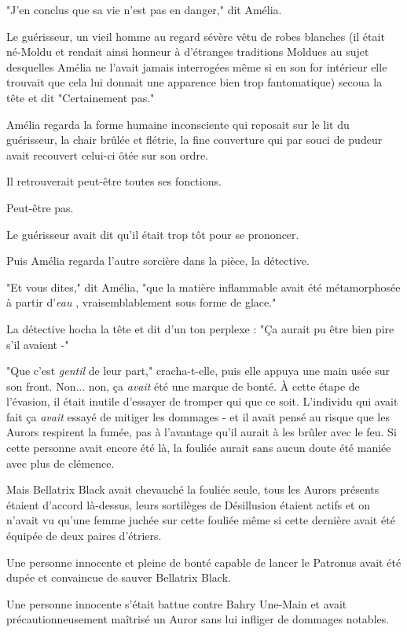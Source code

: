 "J'en conclus que sa vie n'est pas en danger," dit Amélia.

Le guérisseur, un vieil homme au regard sévère vêtu de robes blanches (il était né-Moldu et rendait ainsi honneur à d'étranges traditions Moldues au sujet desquelles Amélia ne l'avait jamais interrogées même si en son for intérieur elle trouvait que cela lui donnait une apparence bien trop fantomatique) secoua la tête et dit "Certainement pas."

Amélia regarda la forme humaine inconsciente qui reposait sur le lit du guérisseur, la chair brûlée et flétrie, la fine couverture qui par souci de pudeur avait recouvert celui-ci ôtée sur son ordre.

Il retrouverait peut-être toutes ses fonctions.

Peut-être pas.

Le guérisseur avait dit qu'il était trop tôt pour se prononcer.

Puis Amélia regarda l'autre sorcière dans la pièce, la détective.

"Et vous dites," dit Amélia, "que la matière inflammable avait été métamorphosée à partir d'\emph{eau} , vraisemblablement sous forme de glace."

La détective hocha la tête et dit d'un ton perplexe : "Ça aurait pu être bien pire s'il avaient -"

"Que c'est \emph{gentil}  de leur part," cracha-t-elle, puis elle appuya une main usée sur son front. Non... non, ça \emph{avait}  été une marque de bonté. À cette étape de l'évasion, il était inutile d'essayer de tromper qui que ce soit. L'individu qui avait fait ça \emph{avait}  essayé de mitiger les dommages - et il avait pensé au risque que les Aurors respirent la fumée, pas à l'avantage qu'il aurait à les brûler avec le feu. Si cette personne avait encore été là, la fouliée aurait sans aucun doute été maniée avec plus de clémence.

Mais Bellatrix Black avait chevauché la fouliée seule, tous les Aurors présents étaient d'accord là-dessus, leurs sortilèges de Désillusion étaient actifs et on n'avait vu qu'une femme juchée sur cette fouliée même si cette dernière avait été équipée de deux paires d'étriers.

Une personne innocente et pleine de bonté capable de lancer le Patronus avait été dupée et convaincue de sauver Bellatrix Black.

Une personne innocente s'était battue contre Bahry Une-Main et avait précautionneusement maîtrisé un Auror sans lui infliger de dommages notables.

